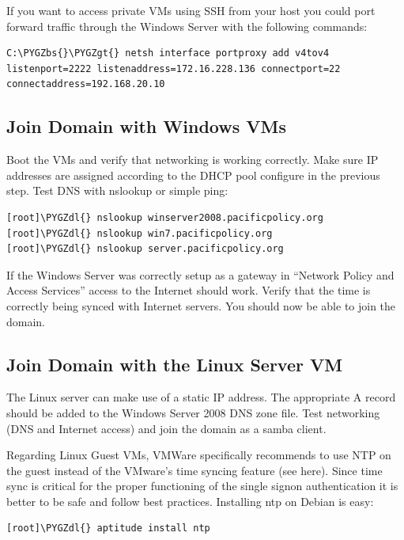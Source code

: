 \documentclass[letterpaper,10pt,english]{sphinxmanual}
\def\PYGZbs{\char`\\}
\def\PYGZgt{\char`\>}
\def\PYGZdl{\char`\$}
\begin{document}
If you want to access private VMs using SSH from your host you could
port forward traffic through the Windows Server with the following
commands:

\begin{Verbatim}[commandchars=\\\{\}]
C:\PYGZbs{}\PYGZgt{} netsh interface portproxy add v4tov4 listenport=2222 listenaddress=172.16.228.136 connectport=22 connectaddress=192.168.20.10
\end{Verbatim}


\subsection{Join Domain with Windows VMs}
\label{administrator-guide:join-domain-with-windows-vms}
Boot the VMs and verify that networking is working correctly. Make
sure IP addresses are assigned according to the DHCP pool configure in
the previous step. Test DNS with nslookup or simple ping:

\begin{Verbatim}[commandchars=\\\{\}]
[root]\PYGZdl{} nslookup winserver2008.pacificpolicy.org
[root]\PYGZdl{} nslookup win7.pacificpolicy.org
[root]\PYGZdl{} nslookup server.pacificpolicy.org
\end{Verbatim}

If the Windows Server was correctly setup as a gateway in ``Network
Policy and Access Services'' access to the Internet should work. Verify
that the time is correctly being synced with Internet servers. You
should now be able to join the domain.


\subsection{Join Domain with the Linux Server VM}
\label{administrator-guide:join-domain-with-the-linux-server-vm}
The Linux server can make use of a static IP address. The appropriate
A record should be added to the Windows Server 2008 DNS zone
file. Test networking (DNS and Internet access) and join the domain as
a samba client.

Regarding Linux Guest VMs, VMWare specifically recommends to use NTP
on the guest instead of the VMware's time syncing feature (see
here). Since time sync is critical for the proper functioning of the
single signon authentication it is better to be safe and follow best
practices.  Installing ntp on Debian is easy:

\begin{Verbatim}[commandchars=\\\{\}]
[root]\PYGZdl{} aptitude install ntp
\end{Verbatim}
\end{document}
